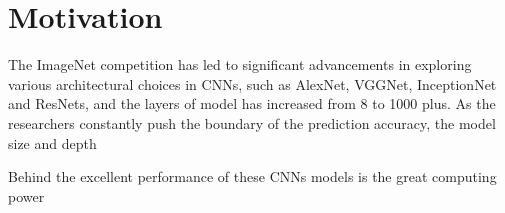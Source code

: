 \section{Motivation}
The ImageNet competition has led to significant advancements in exploring various architectural
choices in CNNs, such as AlexNet, VGGNet, InceptionNet and ResNets, and the layers of model has increased from
8 to 1000 plus. As the researchers constantly push the boundary of the prediction accuracy, the model size
and depth


Behind the excellent performance of these CNNs models is the great computing power





